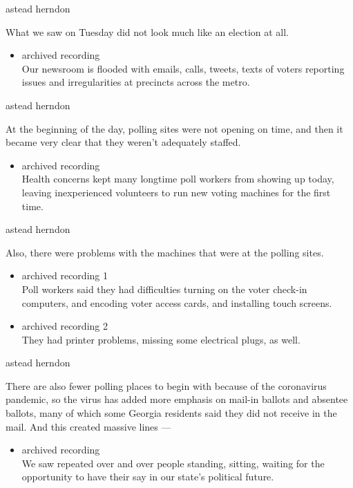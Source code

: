astead herndon

What we saw on Tuesday did not look much like an election at all.

\begin{itemize}
\tightlist
\item
  archived recording\\
  Our newsroom is flooded with emails, calls, tweets, texts of voters
  reporting issues and irregularities at precincts across the metro.
\end{itemize}

astead herndon

At the beginning of the day, polling sites were not opening on time, and
then it became very clear that they weren't adequately staffed.

\begin{itemize}
\tightlist
\item
  archived recording\\
  Health concerns kept many longtime poll workers from showing up today,
  leaving inexperienced volunteers to run new voting machines for the
  first time.
\end{itemize}

astead herndon

Also, there were problems with the machines that were at the polling
sites.

\begin{itemize}
\item
  archived recording 1\\
  Poll workers said they had difficulties turning on the voter check-in
  computers, and encoding voter access cards, and installing touch
  screens.
\item
  archived recording 2\\
  They had printer problems, missing some electrical plugs, as well.
\end{itemize}

astead herndon

There are also fewer polling places to begin with because of the
coronavirus pandemic, so the virus has added more emphasis on mail-in
ballots and absentee ballots, many of which some Georgia residents said
they did not receive in the mail. And this created massive lines ---

\begin{itemize}
\tightlist
\item
  archived recording\\
  We saw repeated over and over people standing, sitting, waiting for
  the opportunity to have their say in our state's political future.
\end{itemize}

